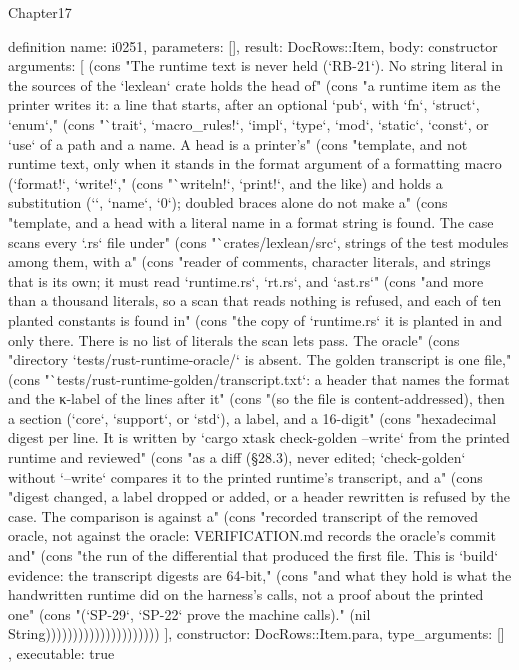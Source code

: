 \begin{lexlean}{Chapter17}
\begin{semanticmodule}
definition{
  name: i0251,
  parameters: [],
  result: DocRows::Item,
  body: constructor{
    arguments: [
      (cons "The runtime text is never held (`RB-21`). No string literal in the sources of the `lexlean` crate holds the head of" (cons "a runtime item as the printer writes it: a line that starts, after an optional `pub`, with `fn`, `struct`, `enum`," (cons "`trait`, `macro_rules!`, `impl`, `type`, `mod`, `static`, `const`, or `use` of a path and a name. A head is a printer's" (cons "template, and not runtime text, only when it stands in the format argument of a formatting macro (`format!`, `write!`," (cons "`writeln!`, `print!`, and the like) and holds a substitution (`{}`, `{name}`, `{0}`); doubled braces alone do not make a" (cons "template, and a head with a literal name in a format string is found. The case scans every `.rs` file under" (cons "`crates/lexlean/src`, strings of the test modules among them, with a" (cons "reader of comments, character literals, and strings that is its own; it must read `runtime.rs`, `rt.rs`, and `ast.rs`" (cons "and more than a thousand literals, so a scan that reads nothing is refused, and each of ten planted constants is found in" (cons "the copy of `runtime.rs` it is planted in and only there. There is no list of literals the scan lets pass. The oracle" (cons "directory `tests/rust-runtime-oracle/` is absent. The golden transcript is one file," (cons "`tests/rust-runtime-golden/transcript.txt`: a header that names the format and the κ-label of the lines after it" (cons "(so the file is content-addressed), then a section (`core`, `support`, or `std`), a label, and a 16-digit" (cons "hexadecimal digest per line. It is written by `cargo xtask check-golden --write` from the printed runtime and reviewed" (cons "as a diff (§28.3), never edited; `check-golden` without `--write` compares it to the printed runtime's transcript, and a" (cons "digest changed, a label dropped or added, or a header rewritten is refused by the case. The comparison is against a" (cons "recorded transcript of the removed oracle, not against the oracle: VERIFICATION.md records the oracle's commit and" (cons "the run of the differential that produced the first file. This is `build` evidence: the transcript digests are 64-bit," (cons "and what they hold is what the handwritten runtime did on the harness's calls, not a proof about the printed one" (cons "(`SP-29`, `SP-22` prove the machine calls)." (nil String)))))))))))))))))))))
    ],
    constructor: DocRows::Item.para,
    type_arguments: []
  },
  executable: true
}


\end{semanticmodule}
\end{lexlean}
